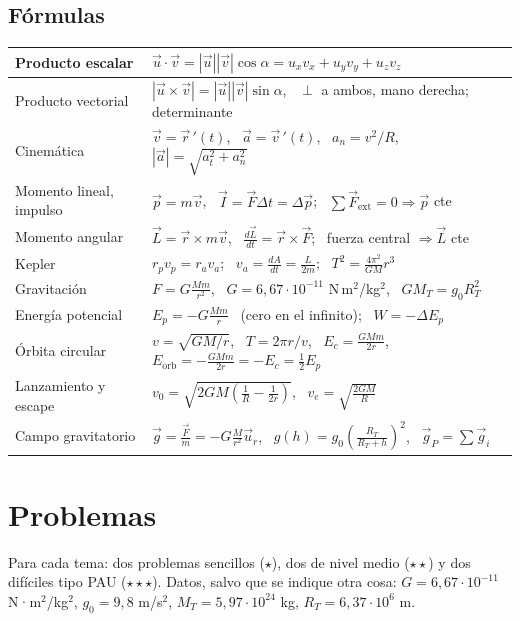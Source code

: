 \documentclass[11pt,a4paper]{article}
\newcommand{\ur}{\vec{u}_r}
\begin{document}
\subsection*{Fórmulas}
\begin{center}
\renewcommand{\arraystretch}{1.6}
\begin{tabular}{|p{4.3cm}|p{10.6cm}|}
\hline
Producto escalar & $\vec u\cdot\vec v=|\vec u||\vec v|\cos\alpha=u_xv_x+u_yv_y+u_zv_z$\\ \hline
Producto vectorial & $|\vec u\times\vec v|=|\vec u||\vec v|\sin\alpha$, \ $\perp$ a ambos, mano derecha; determinante\\ \hline
Cinemática & $\vec v=\vec r\,'(t)$, \ $\vec a=\vec v\,'(t)$, \ $a_n=v^2/R$, \ $|\vec a|=\sqrt{a_t^2+a_n^2}$\\ \hline
Momento lineal, impulso & $\vec p=m\vec v$, \ $\vec I=\vec F\Delta t=\Delta\vec p$; \ $\sum\vec F_{\text{ext}}=0\Rightarrow\vec p$ cte\\ \hline
Momento angular & $\vec L=\vec r\times m\vec v$, \ $\frac{d\vec L}{dt}=\vec r\times\vec F$; \ fuerza central $\Rightarrow\vec L$ cte\\ \hline
Kepler & $r_pv_p=r_av_a$; \ $v_a=\frac{dA}{dt}=\frac{L}{2m}$; \ $T^2=\frac{4\pi^2}{GM}r^3$\\ \hline
Gravitación & $F=G\frac{Mm}{r^2}$, \ $G=6{,}67\cdot10^{-11}$ N\,m$^2$/kg$^2$, \ $GM_T=g_0R_T^2$\\ \hline
Energía potencial & $E_p=-G\frac{Mm}{r}$ \ (cero en el infinito); \ $W=-\Delta E_p$\\ \hline
Órbita circular & $v=\sqrt{GM/r}$, \ $T=2\pi r/v$, \ $E_c=\frac{GMm}{2r}$, \ $E_{\text{orb}}=-\frac{GMm}{2r}=-E_c=\frac12E_p$\\ \hline
Lanzamiento y escape & $v_0=\sqrt{2GM\left(\frac1{R}-\frac1{2r}\right)}$, \ $v_e=\sqrt{\frac{2GM}{R}}$\\ \hline
Campo gravitatorio & $\vec g=\frac{\vec F}{m}=-G\frac{M}{r^2}\ur$, \ $g(h)=g_0\left(\frac{R_T}{R_T+h}\right)^2$, \ $\vec g_P=\sum\vec g_i$\\ \hline
\end{tabular}
\end{center}

\newpage
\section{Problemas}
Para cada tema: dos problemas sencillos ($\star$), dos de nivel medio ($\star\star$) y dos difíciles tipo PAU ($\star\star\star$). Datos, salvo que se indique otra cosa: $G=6{,}67\cdot10^{-11}$ N·m$^2$/kg$^2$, $g_0=9{,}8$ m/s$^2$, $M_T=5{,}97\cdot10^{24}$ kg, $R_T=6{,}37\cdot10^{6}$ m.
\end{document}
